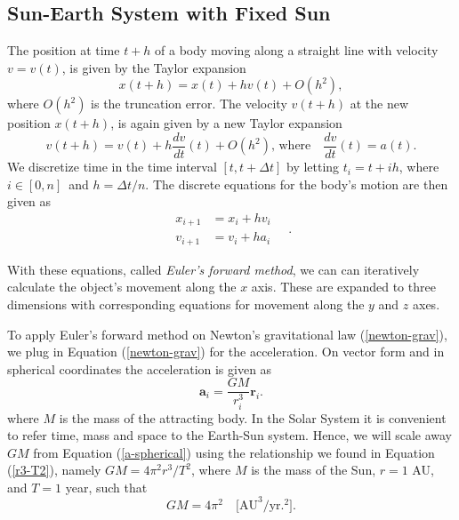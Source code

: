 \documentclass[]{article}
\begin{document}
\subsection{Sun-Earth System with Fixed Sun} \label{sun-earth}
The position at time $t+h$ of a body moving along a straight line with velocity $v = v(t)$, is given by the Taylor expansion
\begin{equation}
	x(t+h) = x(t) + hv(t) + O(h^2),
\end{equation}
where $O(h^2)$ is the truncation error. The velocity $v(t+h)$ at the new position $x(t+h)$, is again given by a new Taylor expansion
\begin{equation}
	v(t+h) = v(t) + h \frac{dv}{dt}(t) + O(h^2) \text{, where} \quad \frac{dv}{dt}(t) = a(t).
\end{equation}
We discretize time in the time interval $[t, t + \Delta t]$ by letting $t_i = t + ih$, where $i \in [0,n]$ and $h = \Delta t/n$. The discrete equations for the body's motion are then given as
\begin{equation}
\begin{aligned}
	x_{i+1} &= x_i + hv_i \\
	v_{i+1} &= v_i + ha_i
\end{aligned} \quad.
\end{equation}


With these equations, called \textit{Euler's forward method}, we can can iteratively calculate the object's movement along the $x$ axis. These are expanded to three dimensions with corresponding equations for movement along the $y$ and $z$ axes. 

To apply Euler's forward method on Newton's gravitational law (\ref{newton-grav}), we plug in Equation (\ref{newton-grav}) for the acceleration. On vector form and in spherical coordinates the acceleration is given as
\begin{equation} \label{a-spherical}
	\mathbf{a}_i = \frac{GM}{r_i^3} \mathbf{r}_i.
\end{equation}
where $M$ is the mass of the attracting body. In the Solar System it is convenient to refer time, mass and space to the Earth-Sun system. Hence, we will scale away $GM$ from Equation (\ref{a-spherical}) using the relationship we found in Equation (\ref{r3-T2}), namely $GM = 4\pi^2r^3/T^2$, where $M$ is the mass of the Sun, $r = 1$ AU, and $T = 1$ year, such that
\begin{equation} \label{a-spherical}
	GM = 4\pi^2 \quad \text{[AU}^3/\text{yr.}^2\text{].}
\end{equation}
\end{document}
